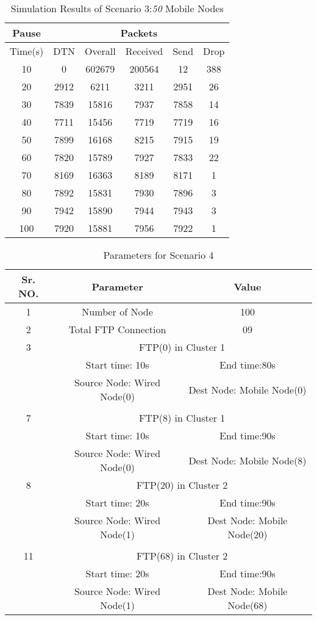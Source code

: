 \documentclass[3p,times]{elsarticle}
\begin{document}
\begin{table}[t]
\centering
\caption{Simulation Results of Scenario 3:\emph{50} Mobile Nodes}
\label{t8}
\begin{tabular}{|c|c|c|c|c|c|}
\hline
Pause  & \multicolumn{5}{c|}{Packets} \\
\hline
Time(s) & DTN   & Overall & Received & Send & Drop \\
\hline
10 & 0 & 602679 & 200564 & 12 &  388 \\
20 & 2912 & 6211 & 3211 & 2951 & 26\\
30 & 7839 & 15816 & 7937 & 7858 & 14 \\
40 & 7711 & 15456 & 7719 & 7719 & 16 \\
50 & 7899 & 16168 & 8215 & 7915 &  19 \\
60 & 7820 & 15789 & 7927 & 7833 &  22 \\
70 & 8169 & 16363 & 8189 & 8171 &  1 \\
80 & 7892 & 15831 & 7930 & 7896 &  3 \\
90 & 7942 & 15890 & 7944 & 7943 &  3 \\
100 & 7920 & 15881 & 7956 & 7922 &  1 \\
\hline
\end{tabular}
\end{table}


\begin{table}[t]
\centering
\caption{Parameters for Scenario 4}
\label{t9}
\begin{tabular}{|c|c|c|}
\hline
Sr. NO. & Parameter & Value \\
\hline
1 & Number of Node & 100 \\
2 & Total FTP Connection & 09 \\
\hline
3 & \multicolumn{2}{|c|}{ FTP(0) in Cluster 1} \\
 & Start time: 10s &  End time:80s\\
 & Source Node: Wired Node(0) & Dest Node: Mobile Node(0) \\
 &  &  \\
\hline
7 & \multicolumn{2}{|c|}{ FTP(8) in Cluster 1} \\
 & Start time: 10s &  End time:90s\\
 & Source Node: Wired Node(0) & Dest Node: Mobile Node(8) \\
\hline
8 & \multicolumn{2}{|c|}{ FTP(20) in Cluster 2} \\
 & Start time: 20s &  End time:90s\\
 & Source Node: Wired Node(1) & Dest Node: Mobile Node(20) \\
\hline
 &  &  \\
\hline
11 & \multicolumn{2}{|c|}{ FTP(68) in Cluster 2} \\
 & Start time: 20s &  End time:90s\\
 & Source Node: Wired Node(1) & Dest Node: Mobile Node(68) \\
\hline
\end{tabular}
\end{table}
\end{document}
